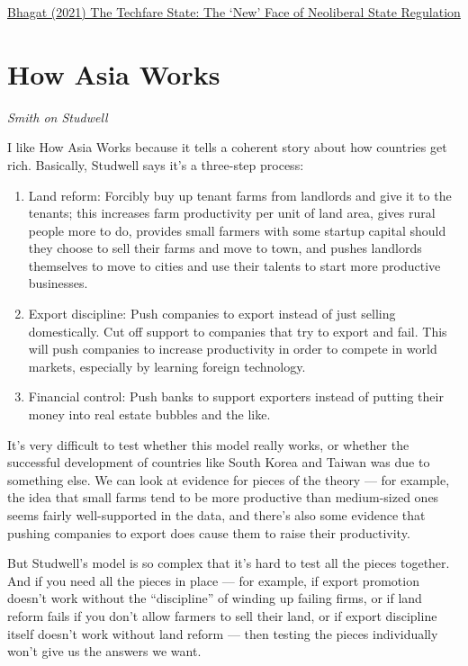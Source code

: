 \documentclass[
]{book}
\begin{document}
\href{https://developingeconomics.org/2021/06/15/the-techfare-state-the-new-face-of-neoliberal-state-regulation/}{Bhagat (2021) The Techfare State: The `New' Face of Neoliberal State Regulation}

\hypertarget{how-asia-works}{%
\section{How Asia Works}\label{how-asia-works}}

\emph{Smith on Studwell}

I like How Asia Works because it tells a coherent story about how countries get rich. Basically, Studwell says it's a three-step process:

\begin{enumerate}
\def\labelenumi{\arabic{enumi}.}
\item
  Land reform: Forcibly buy up tenant farms from landlords and give it to the tenants; this increases farm productivity per unit of land area, gives rural people more to do, provides small farmers with some startup capital should they choose to sell their farms and move to town, and pushes landlords themselves to move to cities and use their talents to start more productive businesses.
\item
  Export discipline: Push companies to export instead of just selling domestically. Cut off support to companies that try to export and fail. This will push companies to increase productivity in order to compete in world markets, especially by learning foreign technology.
\item
  Financial control: Push banks to support exporters instead of putting their money into real estate bubbles and the like.
\end{enumerate}

It's very difficult to test whether this model really works, or whether the successful development of countries like South Korea and Taiwan was due to something else. We can look at evidence for pieces of the theory --- for example, the idea that small farms tend to be more productive than medium-sized ones seems fairly well-supported in the data, and there's also some evidence that pushing companies to export does cause them to raise their productivity.

But Studwell's model is so complex that it's hard to test all the pieces together. And if you need all the pieces in place --- for example, if export promotion doesn't work without the ``discipline'' of winding up failing firms, or if land reform fails if you don't allow farmers to sell their land, or if export discipline itself doesn't work without land reform --- then testing the pieces individually won't give us the answers we want.
\end{document}
